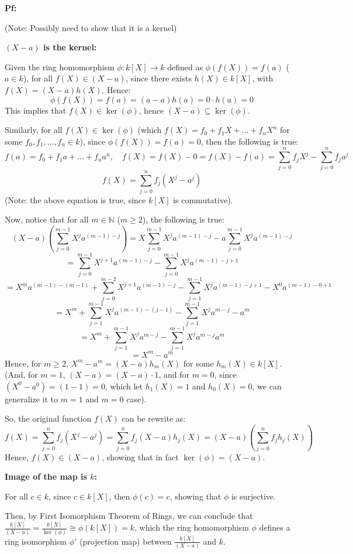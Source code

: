 \documentclass{article}
\begin{document}
\textbf{Pf:}

(Note: Possibly need to show that it is a kernel)

\textbf{$(X-a)$ is the kernel:}

Given the ring homomorphism $\phi:k[X]\rightarrow k$ defined as $\phi(f(X))=f(a)$ ($a\in k$), 
for all $f(X)\in (X-a)$, since there exists $h(X)\in k[X]$, with $f(X)=(X-a)h(X)$. Hence:
$$\phi(f(X))=f(a)=(a-a)h(a)=0\cdot h(a)=0$$
This implies that $f(X)\in \ker(\phi)$, hence $(X-a)\subseteq \ker(\phi)$.

\hfill

Similarly, for all $f(X)\in \ker(\phi)$ (which $f(X)=f_0+f_1X+...+f_nX^n$ for some $f_0,f_1,...,f_n\in k$), since $\phi(f(X))=f(a)=0$, then the following is true:
$$f(a)=f_0+f_1a+...+f_na^n,\quad f(X)=f(X)-0=f(X)-f(a)=\sum_{j=0}^{n}f_jX^j-\sum_{j=0}^{n}f_ja^j$$
$$f(X)=\sum_{j=0}^{n}f_j(X^j-a^j)$$
(Note: the above equation is true, since $k[X]$ is commutative).

Now, notice that for all $m\in\mathbb{N}$ ($m\geq 2$), the following is true:
$$(X-a)\left(\sum_{j=0}^{m-1}X^ja^{(m-1)-j}\right)=X\sum_{j=0}^{m-1}X^ja^{(m-1)-j}-a\sum_{j=0}^{m-1}X^ja^{(m-1)-j}$$
$$=\sum_{j=0}^{m-1}X^{j+1}a^{(m-1)-j}-\sum_{j=0}^{m-1}X^ja^{(m-1)-j+1}$$
$$=X^ma^{(m-1)-(m-1)}+\sum_{j=0}^{m-2}X^{j+1}a^{(m-1)-j}-\sum_{j=1}^{m-1}X^ja^{(m-1)-j+1}-X^0a^{(m-1)-0+1}$$
$$=X^m+\sum_{j=1}^{m-1}X^{j}a^{(m-1)-(j-1)}-\sum_{j=1}^{m-1}X^ja^{m-j}-a^{m}$$
$$=X^m+\sum_{j=1}^{m-1}X^{j}a^{m-j}-\sum_{j=1}^{m-1}X^ja^{m-j}a^{m}$$
$$=X^m-a^m$$
Hence, for $m\geq 2$, $X^m-a^m=(X-a)h_m(X)$ for some $h_m(X)\in k[X]$. (And, for $m=1$, $(X-a)=(X-a)\cdot 1$, and for $m=0$, since $(X^0-a^0)=(1-1)=0$, which let $h_1(X)=1$ and $h_0(X)=0$, we can generalize it to $m=1$ and $m=0$ case).

So, the original function $f(X)$ can be rewrite as:
$$f(X)=\sum_{j=0}^{n}f_j(X^j-a^j)=\sum_{j=0}^{n}f_j(X-a)h_j(X) = (X-a)\left(\sum_{j=0}^{n}f_jh_j(X)\right)$$
Hence, $f(X)\in (X-a)$, showing that in fact $\ker(\phi)=(X-a)$.

\hfill

\textbf{Image of the map is $k$:}

For all $c\in k$, since $c\in k[X]$, then $\phi(c)=c$, showing that $\phi$ is surjective.

\hfill

Then, by First Isomorphism Theorem of Rings, we can conclude that $\frac{k[X]}{(X-a)}=\frac{k[X]}{\ker(\phi)}\cong \phi(k[X])=k$, 
which the ring homomorphism $\phi$ defines a ring isomorphism $\phi'$ (projection map) between $\frac{k[X]}{(X-a)}$ and $k$.
\end{document}
